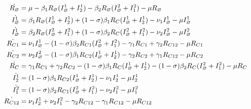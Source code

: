 \begin{align}
\dot{R_\varnothing} &  = \mu -\beta_1 R_\varnothing (I^1_\varnothing +
I^1_{2}) -\beta_2 R_\varnothing (I^2_\varnothing + I^2_{1}) -\mu
R_\varnothing \notag \\
\dot{I^1_\varnothing} & = \beta_1 R_\varnothing (I^1_\varnothing
+I^1_{2}) + (1-\sigma) \beta_1 R_C (I^1_\varnothing +I^1_{2}) -\nu_1
I^1_\varnothing -\mu I^1_\varnothing  \notag \\
\dot{I^1_\varnothing} & = \beta_2 R_\varnothing (I^2_\varnothing
+I^2_{1}) + (1-\sigma) \beta_2 R_C (I^2_\varnothing +I^2_{1}) -\nu_2
I^2_\varnothing -\mu I^2_\varnothing  \notag \\
%
\dot{R_{C1}} &  = \nu_1 I^1_\varnothing -(1-\sigma) \beta_2 R_{C1} (I^2_\varnothing +I^2_{1}) -\gamma_1 R_{C1} +\gamma_2 R_{C12} -\mu R_{C1}  \notag \\
\dot{R_{C2}} &  = \nu_2 I^2_\varnothing -(1-\sigma) \beta_1 R_{C2} (I^1_\varnothing +I^1_{2}) -\gamma_2 R_{C2} +\gamma_1 R_{C12} -\mu R_{C2}  \notag \\
%
\dot{R_C} &  = \gamma_1 R_{C1} + \gamma_2 R_{C2} -(1-\sigma) \beta_1
R_C (I^1_\varnothing +I^1_{2}) -(1-\sigma) \beta_2 R_C
(I^2_\varnothing +I^2_{1}) -\mu R_C   \notag \\
%
\dot{I^1_2} &  = (1-\sigma) \beta_1 R_{C2} (I^1_\varnothing +I^1_{2}) -\nu_1 I^1_2 -\mu I^1_2 \notag \\
\dot{I^2_1} &  = (1-\sigma) \beta_2 R_{C1} (I^2_\varnothing +I^2_{1}) -\nu_2 I^2_1 -\mu I^2_1 \notag \\
%
\dot{R_{C12}} &  = \nu_1 I^1_2 + \nu_2 I^2_1 -\gamma_2 R_{C12} -\gamma_1 R_{C12} -\mu R_{C12}  \notag
\end{align}


